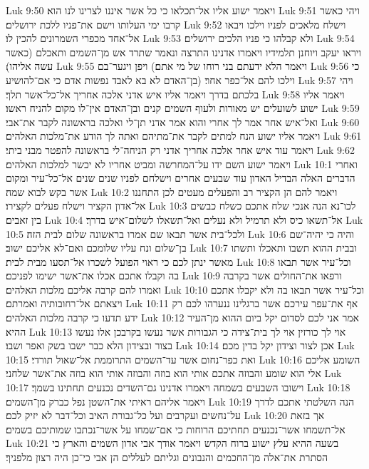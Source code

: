 Luk 9:50  ויאמר ישוע אליו אל־תכלאו כי כל אשר איננו לצרינו לנו הוא׃
Luk 9:51  ויהי כאשר קרבו ימי העלותו וישם את־פניו ללכת ירושלים׃
Luk 9:52  וישלח מלאכים לפניו וילכו ויבאו אל־אחד מכפרי השמרונים להכין לו׃
Luk 9:53  ולא קבלהו כי פניו הלכים ירושלים׃
Luk 9:54  ויראו יעקב ויוחנן תלמידיו ויאמרו אדנינו התרצה ונאמר שתרד אש מן־השמים ותאכלם (כאשר עשה אליהו)׃
Luk 9:55  ויפן ויגער־בם (ויאמר הלא ידעתם בני רוחו של מי אתם׃
Luk 9:56  כי בן־האדם לא בא לאבד נפשות אדם כי אם־להושיע) וילכו להם אל־כפר אחר׃
Luk 9:57  ויהי בלכתם בדרך ויאמר אליו איש אדני אלכה אחריך אל־כל־אשר תלך׃
Luk 9:58  ויאמר אליו ישוע לשועלים יש מאורות ולעוף השמים קנים ובן־האדם אין־לו מקום להניח ראשו׃
Luk 9:59  ואל־איש אחר אמר לך אחרי והוא אמר אדני תן־לי ואלכה בראשונה לקבר את־אבי׃
Luk 9:60  ויאמר אליו ישוע הנח למתים לקבר את־מתיהם ואתה לך הודע את־מלכות האלהים׃
Luk 9:61  ויאמר עוד איש אחר אלכה אחריך אדני רק הניחה־לי בראשונה להפטר מבני ביתי׃
Luk 9:62  ויאמר ישוע השם ידו על־המחרשה ומביט אחריו לא יכשר למלכות האלהים׃
Luk 10:1  ואחרי הדברים האלה הבדיל האדון עוד שבעים אחרים וישלחם לפניו שנים שנים אל־כל־עיר ומקום אשר בקש לבוא שמה׃
Luk 10:2  ויאמר להם הן הקציר רב והפעלים מעטים לכן התחננו אל־אדון הקציר וישלח פעלים לקצירו׃
Luk 10:3  לכו־נא הנה אנכי שלח אתכם כשלח כבשים בין זאבים׃
Luk 10:4  אל־תשאו כיס ולא תרמיל ולא נעלים ואל־תשאלו לשלום־איש בדרך׃
Luk 10:5  ולכל־בית אשר תבאו שם אמרו בראשונה שלום לבית הזה׃
Luk 10:6  והיה כי יהיה־שם בן־שלום ונח עליו שלומכם ואם־לא אליכם ישוב׃
Luk 10:7  ובבית ההוא תשבו ותאכלו ותשתו מאשר ינתן לכם כי ראוי הפועל לשכרו אל־תסעו מבית לבית׃
Luk 10:8  וכל־עיר אשר תבאו בה וקבלו אתכם אכלו את־אשר ישימו לפניכם׃
Luk 10:9  ורפאו את־החולים אשר בקרבה ואמרו להם קרבה אליכם מלכות האלהים׃
Luk 10:10  וכל־עיר אשר תבאו בה ולא יקבלו אתכם ויצאתם אל־רחובותיה ואמרתם׃
Luk 10:11  אף את־עפר עירכם אשר ברגלינו ננערהו לכם רק ידע תדעו כי קרבה מלכות האלהים׃
Luk 10:12  אמר אני לכם לסדום יקל ביום ההוא מן־העיר ההיא׃
Luk 10:13  אוי לך כורזין אוי לך בית־צידה כי הגבורות אשר נעשו בקרבכן אלו נעשו בצור ובצידון הלא כבר ישבו בשק ואפר ושבו׃
Luk 10:14  אכן לצור וצידון יקל בדין מכם׃
Luk 10:15  ואת כפר־נחום אשר עד־השמים התרוממת אל־שאול תורדי׃
Luk 10:16  השומע אליכם אלי הוא שומע והבוזה אתכם אותי הוא בוזה והבוזה אותי הוא בוזה את־אשר שלחני׃
Luk 10:17  וישובו השבעים בשמחה ויאמרו אדנינו גם־השדים נכנעים תחתינו בשמך׃
Luk 10:18  ויאמר אליהם ראיתי את־השטן נפל כברק מן־השמים׃
Luk 10:19  הנה השלטתי אתכם לדרך על־נחשים ועקרבים ועל כל־גבורת האיב וכל־דבר לא יזיק לכם׃
Luk 10:20  אך בזאת אל־תשמחו אשר־נכנעים תחתיכם הרוחות כי אם־שמחו על אשר־נכתבו שמותיכם בשמים׃
Luk 10:21  בשעה ההיא עלץ ישוע ברוח הקדש ויאמר אודך אבי אדון השמים והארץ כי הסתרת את־אלה מן־החכמים והנבונים וגליתם לעללים הן אבי כי־כן היה רצון מלפניך׃
